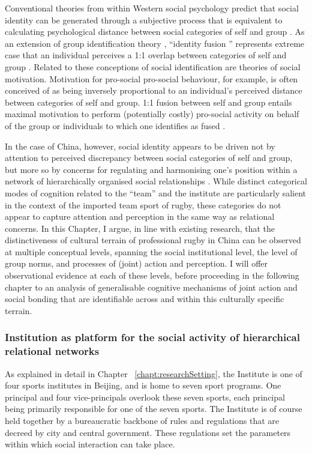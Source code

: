 \begin{CJK}{UTF8}{gbsn}
Conventional theories from within Western social psychology predict that social identity can be generated through a subjective process that is equivalent to calculating psychological distance between social categories of self and group \citep{Tajfel1971}.  As an extension of group identification theory \citep{Turner1987}, ``identity fusion '' represents extreme case that an individual perceives a 1:1 overlap between categories of self and group \citep{Swann2009}.  Related to these conceptions of social identification are theories of social motivation.  Motivation for pro-social pro-social behaviour, for example, is often conceived of as being inversely proportional to an individual's perceived distance between categories of self and group. 1:1 fusion between self and group entails maximal motivation to perform (potentially costly) pro-social activity on behalf of the group or individuals to which one identifies as fused \citep{Swann2015}.

In the case of China, however, social identity appears to be driven not by attention to perceived discrepancy between social categories of self and group, but more so by concerns for regulating and harmonising one's position within a network of hierarchically organised social relationships \citep{Liu2009}.  While distinct categorical modes of cognition related to the ``team'' and the institute are particularly salient in the context of the imported team sport of rugby, these categories do not appear to capture attention and perception in the same way as relational concerns.   In this Chapter, I argue, in line with existing research, that the distinctiveness of cultural terrain of professional rugby in China can be observed at multiple conceptual levels, spanning the social institutional level,  the level of group norms, and processes of (joint) action and perception.  I will offer observational evidence at each of these levels, before proceeding in the following chapter to an analysis of generalisable cognitive mechanisms of joint action and social bonding that are identifiable across and within this culturally specific terrain.


\subsubsection{Institution as platform for the social activity of hierarchical relational networks\label{sect:institutionPlatform}}

As explained in detail in Chapter ~\ref{chapt:researchSetting}, the Institute is one of four sports institutes in Beijing, and is home to seven sport programs.  One principal and four vice-principals overlook these seven sports, each principal being primarily responsible for one of the seven sports.  The Institute is of course held together by a bureaucratic backbone of rules and regulations that are decreed by city and central government.  These regulations set the parameters within which social interaction can take place.


\end{CJK}
